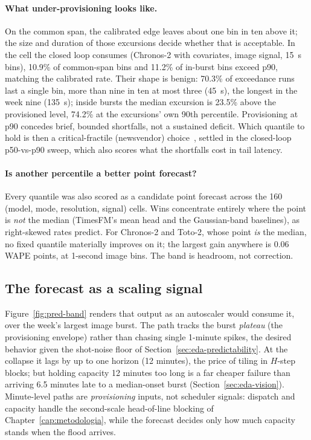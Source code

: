 \paragraph{What under-provisioning looks like.} On the common span, the
calibrated edge leaves about one bin in ten above it; the size and duration
of those excursions decide whether that is acceptable. In the cell the
closed loop consumes (Chronos-2 with covariates, image signal,
\SI{15}{\second} bins), 10.9\% of common-span
bins and 11.2\% of in-burst bins exceed p90, matching the calibrated rate.
Their shape is benign: 70.3\% of exceedance runs last a single bin,
more than nine in ten at most three (\SI{45}{\second}), the longest in the
week nine (\SI{135}{\second}); inside bursts the median excursion is 23.5\%
above the provisioned level, 74.2\% at the excursions' own 90th percentile.
Provisioning at p90 concedes brief, bounded shortfalls, not a sustained
deficit. Which quantile to hold is then a critical-fractile (newsvendor)
choice~\cite{Arrow1951Newsvendor}, settled in the closed-loop p50-vs-p90
sweep, which also scores what the shortfalls cost in tail latency.

\paragraph{Is another percentile a better point forecast?} Every quantile
was also scored as a candidate point forecast across the 160 (model, mode,
resolution, signal) cells. Wins concentrate entirely where the point is
\emph{not} the median (TimesFM's mean head and the Gaussian-band
baselines), as right-skewed rates predict. For Chronos-2 and Toto-2,
whose point \emph{is} the median, no fixed quantile materially improves on
it; the largest gain anywhere is 0.06 WAPE points, at 1-second image bins.
The band is headroom, not correction.

\subsection{The forecast as a scaling signal}
\label{sec:pred-signal}

Figure~\ref{fig:pred-band} renders that output as an autoscaler would
consume it, over the week's largest image burst. The path tracks the burst
\emph{plateau} (the provisioning envelope) rather than chasing single
1-minute spikes, the desired behavior given the shot-noise floor of
Section~\ref{sec:eda-predictability}. At the collapse it lags by up to one
horizon (12 minutes), the price of tiling in $H$-step blocks; but holding
capacity 12 minutes too long is a far cheaper failure than arriving 6.5
minutes late to a median-onset burst (Section~\ref{sec:eda-vision}).
Minute-level paths are \emph{provisioning} inputs, not scheduler signals:
dispatch and capacity handle the second-scale head-of-line blocking of
Chapter~\ref{cap:metodologia}, while the forecast decides only how much
capacity stands when the flood arrives.

